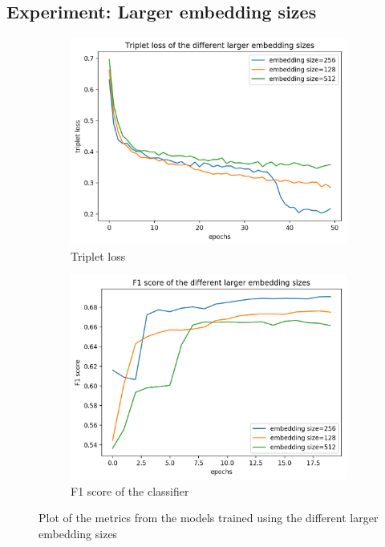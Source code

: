 \subsection{Experiment: Larger embedding sizes}
\label{sub:Experiment-Larger-Embedding-Sizes}
\begin{figure}[htb]
\centering
\begin{subfigure}{.5\linewidth}
  \centering
  \includegraphics[width=.9\linewidth]{img/triplet_loss_dcase_embedding_large.png}
  \caption{Triplet loss}
  \label{fig:plot-triplet-loss-embedding-sizes-larger}
\end{subfigure}%
\begin{subfigure}{.5\linewidth}
  \centering
  \includegraphics[width=.9\linewidth]{img/f1_dcase_embedding_large.png}
  \caption{F1 score of the classifier}
  \label{fig:classifier-f1-embedding-sizes-larger}
\end{subfigure}
\caption{Plot of the metrics from the models trained using the different larger embedding sizes}
\label{fig:embedding-sizes-larger-experiment-metrics}
\end{figure}
